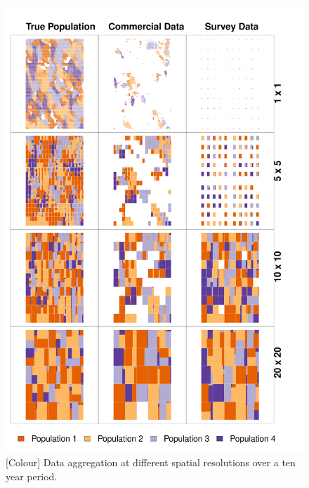 \documentclass[review]{elsarticle}
\begin{document}
\begin{figure}[!ht]
	\includegraphics[width=\linewidth]{../analysis/Data_Aggregation_space_Rev2}
	\caption{[Colour] Data aggregation at different spatial resolutions over a
		ten year period.}
	\label{fig:1}
\end{figure}	
\end{document}
